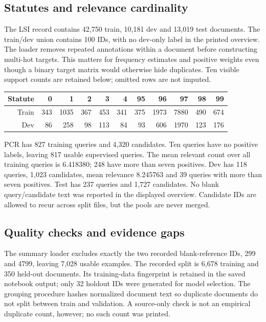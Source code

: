 \subsection{Statutes and relevance cardinality}
The LSI record contains 42,750 train, 10,181 dev and 13,019 test documents. The train/dev union contains
100 IDs, with no dev-only label in the printed overview. The loader removes repeated annotations within
a document before constructing multi-hot targets. This matters for frequency estimates and positive
weights even though a binary target matrix would otherwise hide duplicates. Ten visible support counts
are retained below; omitted rows are not imputed.
\begin{table}[H]\centering\small
\begin{tabular}{rrrrrrrrrrr}
\toprule Statute & 0 & 1 & 2 & 3 & 4 & 95 & 96 & 97 & 98 & 99\\\midrule
Train & 343 & 1035 & 367 & 453 & 341 & 375 & 1973 & 7880 & 490 & 674\\
Dev & 86 & 258 & 98 & 113 & 84 & 93 & 606 & 1970 & 123 & 176\\\bottomrule
\end{tabular}\end{table}

PCR has 827 training queries and 4,320 candidates. Ten queries have no positive labels, leaving 817
usable supervised queries. The mean relevant count over all training queries is 6.418380; 248 have more
than seven positives. Dev has 118 queries, 1,023 candidates, mean relevance 8.245763 and 39 queries with
more than seven positives. Test has 237 queries and 1,727 candidates. No blank query/candidate text was
reported in the displayed overview. Candidate IDs are allowed to recur across split files, but the pools
are never merged.

\subsection{Quality checks and evidence gaps}
The summary loader excludes exactly the two recorded blank-reference IDs, 299 and 4799, leaving 7,028
usable examples. The recorded split is 6,678 training and 350 held-out documents. Its training-data
fingerprint is retained in the saved notebook output; only 32 holdout IDs were generated for model
selection. The grouping procedure hashes normalized document text so duplicate documents do not split
between train and validation. A source-only check is not an empirical duplicate count, however; no such
count was printed.

